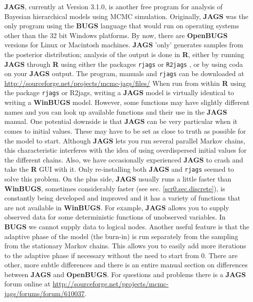 {\bf JAGS}, currently at Version 3.1.0, is another free program for analysis 
of Bayesian hierarchical models using MCMC simulation. Originally, {\bf JAGS}
 was the only program using the {\bf BUGS} language that would run on 
 operating systems other than the 32 bit Windows platforms. By now, there 
 are {\bf OpenBUGS} versions for Linux or Macintosh machines.
{\bf JAGS} 'only' generates samples from the posterior distribution; 
analysis of the output is done in {\bf R}, either by running {\bf JAGS} 
through {\bf R} using either the packages \mbox{\tt rjags} 
\citep{plummer:2011} or \mbox{\tt R2jags} \citep{su_yajima:2011}, or by 
using coda on your {\bf JAGS} output. The program, manuals and \mbox{\tt rjags} 
can be downloaded at \url{http://sourceforge.net/projects/mcmc-jags/files/}
When run from within {\bf R} using the package \mbox{\tt rjags} or \mbox{R2jags}, 
writing a \mbox{\bf JAGS} model is virtually identical to writing a {\bf WinBUGS}
 model. However, some functions may have slightly different names and you 
 can look up available functions and their use in the {\bf JAGS} 
 manual. One potential downside is that {\bf JAGS} can be very particular 
 when it comes to initial values. These may have to be set as close to 
 truth as possible for the model to start. Although {\bf JAGS} lets 
 you run several parallel Markov chains, this characteristic interferes 
 with the idea of using overdispersed initial values for the different 
 chains. Also, we have occasionally experienced {\bf JAGS} to crash and 
 take the {\bf R} GUI with it. Only re-installing both {\bf JAGS} and 
 {\tt rjags} seemed to solve this problem.
On the plus side, {\bf JAGS} usually runs a little faster than {\bf WinBUGS},
 sometimes considerably faster (see sec. \ref {scr0.sec.discrete}), is constantly 
 being developed and improved and it has a variety of functions that are 
 not available in {\bf WinBUGS}. For example, {\bf JAGS} allows you to 
 supply observed data for some deterministic functions of unobserved 
 variables. In {\bf BUGS} we cannot supply data to logical nodes. 
 Another useful feature is that the adaptive phase of the model 
 (the burn-in) is run separately from the sampling from the stationary 
 Markov chains. This allows you to easily add more iterations to the 
 adaptive phase if necessary without the need to start from 0. There 
 are other, more subtle differences and there is an entire manual section 
 on differences between {\bf JAGS} and {\bf OpenBUGS}.
For questions and problems there is a {\bf JAGS} forum online at 
\url{http://sourceforge.net/projects/mcmc-jags/forums/forum/610037}.

